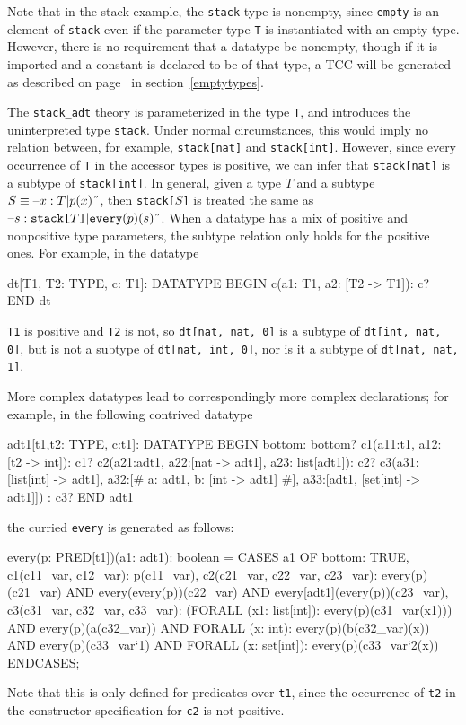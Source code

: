 Note that in the stack example, the \texttt{stack} type is nonempty, since
\texttt{empty} is an element of \texttt{stack} even if the parameter type
\texttt{T} is instantiated with an empty type.  However, there is no
requirement that a datatype be nonempty, though if it is imported and a
constant is declared to be of that type, a TCC will be generated as
described on page~\pageref{emptytypes} in section~\ref{emptytypes}.

The \texttt{stack\_adt} theory is parameterized in the type \texttt{T},
and introduces the uninterpreted type \texttt{stack}.  Under normal
circumstances, this would imply no relation between, for example,
\texttt{stack[nat]} and \texttt{stack[int]}.  However, since every
occurrence of \texttt{T} in the accessor types is positive, we can infer
that \texttt{stack[nat]} is a subtype of \texttt{stack[int]}.  In general,
given a type $T$ and a subtype $S \equiv \setb{}x:T | p(x)\sete$, then
\texttt{stack[$S$]} is treated the same as $\setb{}s:
\texttt{stack[}T\texttt{]} | \texttt{every}(p)(s)\sete$.  When a datatype
has a mix of positive and nonpositive type parameters, the subtype
relation only holds for the positive ones.  For example, in the datatype
\begin{session}
  dt[T1, T2: TYPE, c: T1]: DATATYPE
   BEGIN
    c(a1: T1, a2: [T2 -> T1]): c?
   END dt
\end{session}
\texttt{T1} is positive and \texttt{T2} is not, so \texttt{dt[nat, nat,
0]} is a subtype of \texttt{dt[int, nat, 0]}, but is not a subtype of
\texttt{dt[nat, int, 0]}, nor is it a subtype of \texttt{dt[nat, nat, 1]}.

More complex datatypes lead to correspondingly more complex declarations;
for example, in the following contrived datatype
\begin{session}
  adt1[t1,t2: TYPE, c:t1]: DATATYPE
   BEGIN
    bottom: bottom?
    c1(a11:t1, a12: [t2 -> int]): c1?
    c2(a21:adt1, a22:[nat -> adt1], a23: list[adt1]): c2?
    c3(a31:[list[int] -> adt1],
       a32:[# a: adt1, b: [int -> adt1] #],
       a33:[adt1, [set[int] -> adt1]]) : c3?
   END adt1
\end{session}
the curried \texttt{every} is generated as follows:
\begin{session}
  every(p: PRED[t1])(a1: adt1):  boolean =
      CASES a1
        OF bottom: TRUE,
           c1(c11_var, c12_var): p(c11_var),
           c2(c21_var, c22_var, c23_var):
             every(p)(c21_var) AND
              every(every(p))(c22_var) AND every[adt1](every(p))(c23_var),
           c3(c31_var, c32_var, c33_var):
                  (FORALL (x1: list[int]): every(p)(c31_var(x1)))
              AND every(p)(a(c32_var))
              AND FORALL (x: int): every(p)(b(c32_var)(x))
              AND every(p)(c33_var`1)
              AND FORALL (x: set[int]): every(p)(c33_var`2(x))
        ENDCASES;
\end{session}
Note that this is only defined for predicates over \texttt{t1}, since
the occurrence of \texttt{t2} in the constructor specification for
\texttt{c2} is not positive.

